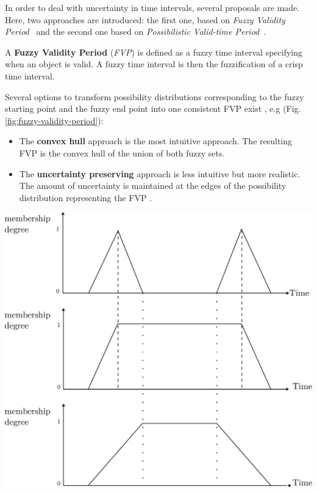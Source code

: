 In order to deal with uncertainty in time intervals, several proposals are made. Here, two approaches are introduced: the first one, based on \emph{Fuzzy Validity Period}~\cite{Garrido2009} and the second one based on \emph{Possibilistic Valid-time Period}~\cite{JoseEnriquePons2012}.

\begin{definition}
A \textbf{Fuzzy Validity Period} (\emph{FVP}) is defined as a fuzzy time interval specifying when an object is valid. A fuzzy time interval is then the fuzzification of a crisp time interval.
\end{definition}
Several options to transform possibility distributions corresponding to the fuzzy starting point and the fuzzy end point into one consistent FVP exist \cite{Garrido2009}, e.g (Fig. \ref{fig:fuzzy-validity-period}):
\begin{itemize}
\item The \textbf{convex hull} approach is the most intuitive approach. The resulting FVP is the convex hull of the union of both fuzzy sets.
\item The \textbf{uncertainty preserving} approach is less intuitive but more realistic. The amount of uncertainty is maintained at the edges of the possibility distribution representing the FVP \cite{Garrido2009}.
\end{itemize}

\vspace*{13pt}
\begin{center}
{
\includegraphics[scale=0.25]{./graphs/comparisoncv.pdf}

}
\end{center}
\vspace*{10pt}
\vspace*{13pt}


